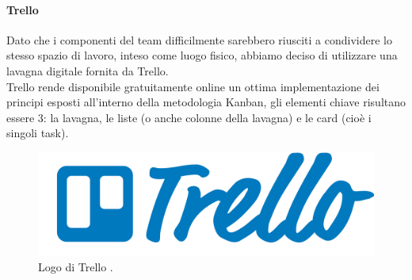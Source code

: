 \paragraph{Trello}
Dato che i componenti del team difficilmente sarebbero riusciti a condividere lo stesso spazio di lavoro, inteso come luogo fisico, abbiamo deciso di utilizzare una lavagna digitale fornita da Trello.
\\ Trello rende disponibile gratuitamente online un ottima implementazione dei principi esposti all'interno della metodologia Kanban, gli elementi chiave risultano essere 3: la lavagna, le liste (o anche colonne della lavagna) e le card (cioè i singoli task).
\begin{figure}[h!]
	\centering
	\includegraphics[scale=0.08]{figures/trello-logo}
	\caption[Logo Trello]{Logo di Trello \cite{trello}.
		\label{fig:logoGCP}}
\end{figure}
